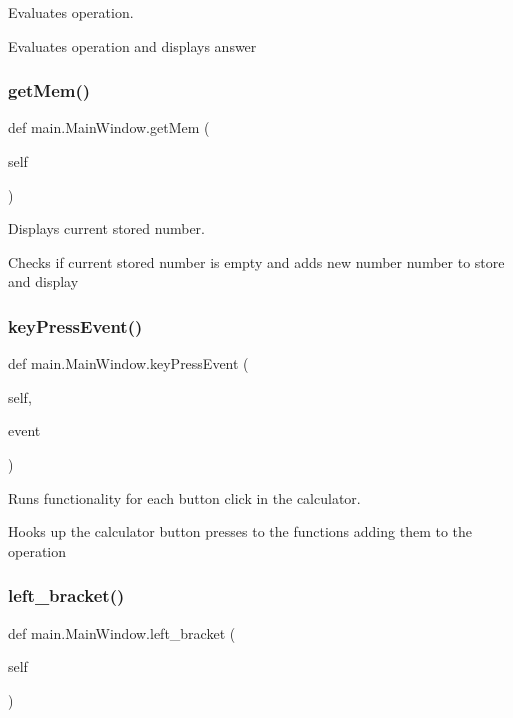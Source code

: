 Evaluates operation. 

Evaluates operation and displays answer \mbox{\label{classmain_1_1_main_window_a77d526c3d373219cdd6d6d0437ac3660}} 
\subsubsection{\texorpdfstring{get\+Mem()}{getMem()}}
{\footnotesize\ttfamily def main.\+Main\+Window.\+get\+Mem (\begin{DoxyParamCaption}\item[{}]{self }\end{DoxyParamCaption})}



Displays current stored number. 

Checks if current stored number is empty and adds new number number to store and display \mbox{\label{classmain_1_1_main_window_a298fe7db20162628212e8f665dc098f5}} 
\subsubsection{\texorpdfstring{key\+Press\+Event()}{keyPressEvent()}}
{\footnotesize\ttfamily def main.\+Main\+Window.\+key\+Press\+Event (\begin{DoxyParamCaption}\item[{}]{self,  }\item[{}]{event }\end{DoxyParamCaption})}



Runs functionality for each button click in the calculator. 

Hooks up the calculator button presses to the functions adding them to the operation \mbox{\label{classmain_1_1_main_window_a2e0fc10335f0a466d3681cb2ca47d72c}} 
\subsubsection{\texorpdfstring{left\+\_\+bracket()}{left\_bracket()}}
{\footnotesize\ttfamily def main.\+Main\+Window.\+left\+\_\+bracket (\begin{DoxyParamCaption}\item[{}]{self }\end{DoxyParamCaption})}



